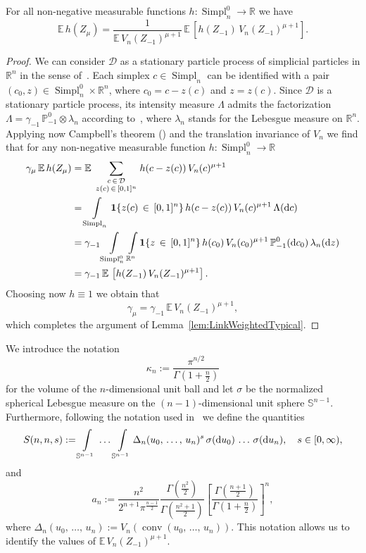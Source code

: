 \documentclass[AHL,Unicode,longabstracts,published]{cedram}
\newcommand{\Sp}{\mathbb S}
\newcommand{\R}{\mathbb{R}}
\newcommand{\EE}{\mathbb{E}\,}
\newcommand{\PP}{\mathbb{P}}
\newcommand{\dd}{{\rm d}}
\newcommand{\dscr}{\mathcal{D}}
\DeclareMathOperator{\Simpl}{Simpl}
\newcommand{\conv}{\mathop{\mathrm{conv}}\nolimits}
\newcommand{\tatop}[2]{\genfrac{}{}{0pt}{1}{#1}{#2}}
\begin{document}
\begin{lemm}\label{lem:LinkWeightedTypical}
For all non-negative measurable functions $h:\Simpl_n^0\to\R$ we have
\[
\EE h(Z_\mu) = \frac{1}{\EE V_n(Z_{-1})^{\mu+1}}\,\EE\left[h(Z_{-1})\,V_n(Z_{-1})^{\mu+1}\right].
\]
\end{lemm}
\begin{proof}
We can consider $\dscr$ as a stationary particle process of simplicial particles in $\R^n$ in the sense of~\cite[Chapter~4]{SW08}. Each simplex $c\in\Simpl_n$ can be identified with a pair $(c_0,z)\in\Simpl_n^0\times\R^n$, where $c_0=c-z(c)$ and $z=z(c)$. Since $\dscr$ is a stationary particle process, its intensity measure $\Lambda$ admits the factorization $\Lambda=\gamma_{-1}\,\PP_{-1}^0\otimes\lambda_n$ according to~\cite[Theorem~4.1.1]{SW08}, where $\lambda_n$ stands for the Lebesgue measure on $\R^n$. Applying now Campbell's theorem (\cite[Theorem~3.1.2]{SW08}) and the translation invariance of $V_n$ we find that for any non-negative measurable function $h:\Simpl_n^0\to\R$
\begin{align*}
\gamma_\mu\,\EE h(Z_\mu) &= \EE\sum_{\tatop{c\,\in\,\dscr}{z(c)\,\in\,[0,1]^n}}h(c-z(c))\,V_n(c)^{\mu+1}\\
&=\int\limits_{\Simpl_n}{\bf 1}\{z(c)\,\in\,[0,1]^n\}\,h(c-z(c))\,V_n(c)^{\mu+1}\,\Lambda(\dd c)\\
&=\gamma_{-1}\int\limits_{\Simpl_n^0}\int\limits_{\R^n}{\bf 1}\{z\,\in\,[0,1]^n\}\,h(c_0)\,V_n(c_0)^{\mu+1}\,\PP_{-1}^0(\dd c_0)\,\lambda_n(\dd z)\\
&=\gamma_{-1}\,\EE\left[h(Z_{-1})\,V_n(Z_{-1})^{\mu+1}\right].
\end{align*}
Choosing now $h\equiv 1$ we obtain that
\[
\gamma_\mu = \gamma_{-1}\,\EE V_n(Z_{-1})^{\mu+1},
\]
which completes the argument of Lemma~\ref{lem:LinkWeightedTypical}.
\end{proof}

We introduce the notation
\[
\kappa_n:=\frac{\pi^{n/2}}{\Gamma(1+\frac{n}{2})}
\]
for the volume of the $n$-dimensional unit ball and let $\sigma$ be the normalized spherical Lebesgue measure on the $(n-1)$-dimensional unit sphere $\Sp^{n-1}$. Furthermore, following the notation used in~\cite[p.~302]{SW08} we define the quantities
\[
S(n,n,s) := \int\limits_{\Sp^{n-1}}\,\ldots\,\int\limits_{\Sp^{n-1}}\Delta_n(u_0,\,\ldots,\,u_n)^{s}\,\sigma(\dd u_0)\,\ldots\,\sigma(\dd u_n),\quad s\in[0,\infty),
\]
and
\[
a_n:=\frac{n^2}{2^{n+1}\pi^{\frac{n-1}{2}}}\frac{\Gamma\left(\frac{n^2}{2}\right)}{\Gamma\left(\frac{n^2+1}{2}\right)}\left[\frac{\Gamma\left(\frac{n+1}{2}\right)}{\Gamma\left(1+\frac{n}{2}\right)}\right]^n,
\]
where $\Delta_n(u_0,\,\ldots,\,u_n):=V_n(\conv(u_0,\,\ldots,\,u_n))$. This notation allows us to identify the values of $\EE V_n(Z_{-1})^{\mu+1}$.
\end{document}
